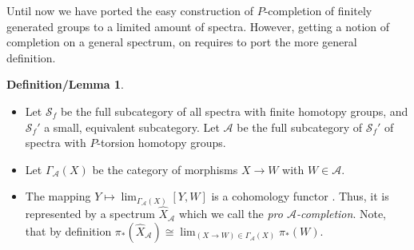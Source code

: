 \documentclass[english]{scrartcl}
\theoremstyle{definition}
\newtheorem*{DefLem}{Definition/Lemma}
\theoremstyle{remark}
\newcommand*{\newdef}[1]{\emph{#1}}
\newcommand*{\Spectra}{\mathcal{S}} %
\newcommand*{\Ps}{P}  %
\newcommand*{\pistar}[2][*]{\pi_{#1}(#2)}  %
\newcommand*{\compl}[2][\Ps]{\hat{#2}_{#1}}  %
\newcommand*{\A}{\mathcal{A}}  %
\begin{document}
Until now we have ported the easy construction of $\Ps$-completion of
finitely generated groups to a limited amount of spectra. However,
getting a notion of completion on a general spectrum, on requires to
port the more general definition.
\begin{DefLem}
  \begin{itemize}
  \item Let $\Spectra_f$ be the full subcategory of all spectra with
    finite homotopy groups, and $\Spectra_f'$ a small, equivalent
    subcategory. 
    Let $\A$ be the full subcategory of $\Spectra_f'$ of spectra with
    $\Ps$-torsion homotopy groups.
  \item Let $\Gamma_\A(X)$ be the category of morphisms $X\to W$
    with $W\in\A$.
  \item The mapping $Y\mapsto\lim_{\Gamma_\A(X)}[Y, W]$ is a
    cohomology functor \cite[Prop. 9.6]{margolis}. Thus, it is
    represented by a spectrum $\compl[\A]X$ which we call the
    \newdef{pro $\A$-completion}.
    Note, that by definition
    $\pistar{\compl[\A]X} \cong \lim_{(X\to W)\in\Gamma_\A(X)}\pistar W$.
  \end{itemize}
\end{DefLem}
\end{document}
